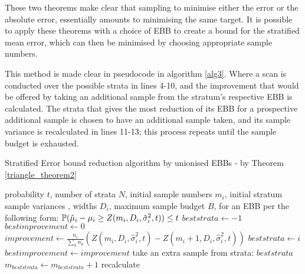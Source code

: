 These two theorems make clear that sampling to minimise either the error or the absolute error, essentially amounts to minimising the same target.
It is possible to apply these theorems with a choice of EBB to create a bound for the stratified mean error, which can then be minimised by choosing appropriate sample numbers.

This method is made clear in pseudocode in \DIFaddbegin {}\DIFaddend algorithm \ref{alg3}.
Where a scan is conducted over the possible strata in lines 4-10, and the improvement that would be offered by taking an additional sample from the stratum's respective EBB is calculated.
The strata that gives the most reduction of its EBB for a prospective additional sample is chosen to have an additional sample taken, and its sample variance is recalculated in lines 11-13; this process repeats until the sample budget is exhausted.

\begin{algorithm}
\caption[Stratified Error bound reduction algorithm by unionised EBBs]{Stratified Error bound reduction algorithm by unionised EBBs - by Theorem \ref{triangle_theorem2}}
\label{alg3}
\begin{algorithmic}[1]
    \REQUIRE probability $t$, number of strata $N$, initial sample numbers $m_i$, initial stratum sample variances \DIFdelbegin {}\DIFdelend \DIFaddbegin {}\DIFaddend , widths $D_i$, maximum sample budget $B$,
    for an EBB per the following form: $\operatorname{\mathbb{P}}(\hat{\mu}_i-\mu_i \ge Z(m_i,D_i,\hat{\sigma}^2_i,t)) \le t $
        \STATE $beststrata \leftarrow -1$
        \STATE $bestimprovement \leftarrow 0$
    		\STATE $improvement \leftarrow \frac{n_i}{\sum_kn_k}\left(Z(m_i,D_i,\hat{\sigma}^2_i,t) - Z(m_i+1,D_i,\hat{\sigma}^2_i,t)\right)$
    	        \STATE $beststrata \leftarrow i$
    	        \STATE $bestimprovement \leftarrow improvement$
    	    \ENDIF
    	\ENDFOR
    	\STATE take an extra sample from strata: $beststrata$
	    \STATE $m_{beststrata} \leftarrow m_{beststrata} + 1$
    	\STATE recalculate \DIFdelbegin {}\DIFdelend \DIFaddbegin {}\DIFaddend \ENDWHILE
\end{algorithmic}
\end{algorithm}

